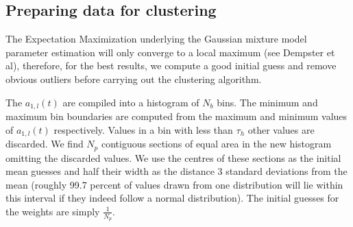 \documentclass[letterpaper,12pt]{report}
\begin{document}
\subsection{Preparing data for clustering}
The Expectation Maximization underlying the Gaussian mixture model parameter
estimation will only converge to a local maximum (see Dempster et al), therefore, for the best
results, we compute a good initial guess and remove obvious outliers before
carrying out the clustering algorithm.

The $a_{1,l}(t)$ are compiled into a histogram of $N_{b}$ bins. The minimum and
maximum bin boundaries are computed from the maximum and minimum values of
$a_{1,l}(t)$ respectively. Values in a bin with less than $\tau_{h}$ other
values are discarded. We find $N_{p}$ contiguous sections of equal area in the
new histogram omitting the discarded values.  We use the centres of these
sections as the initial mean guesses and half their width as the distance 3
standard deviations from the mean (roughly 99.7 percent of values drawn from one
distribution will lie within this interval if they indeed follow a normal
distribution). The initial guesses for the weights are simply $\frac{1}{N_{p}}$.
\end{document}
